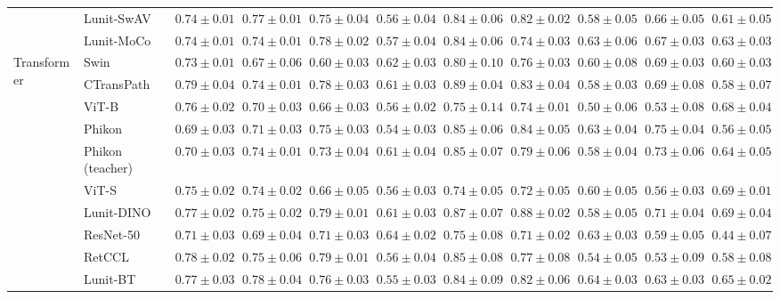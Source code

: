 \begin{tabular}{ll|cccc|c|cccc}
 & Lunit-SwAV & $0.74 \pm 0.01$ & $0.77 \pm 0.01$ & $0.75 \pm 0.04$ & $0.56 \pm 0.04$ & $0.84 \pm 0.06$ & $0.82 \pm 0.02$ & $0.58 \pm 0.05$ & $0.66 \pm 0.05$ & $0.61 \pm 0.05$ \\
 & Lunit-MoCo & $0.74 \pm 0.01$ & $0.74 \pm 0.01$ & $0.78 \pm 0.02$ & $0.57 \pm 0.04$ & $0.84 \pm 0.06$ & $0.74 \pm 0.03$ & $\mathbf{0.63 \pm 0.06}$ & $0.67 \pm 0.03$ & $0.63 \pm 0.03$ \\
\cline{1-11}
\multirow[t]{12}{*}{Transformer} & Swin & $0.73 \pm 0.01$ & $0.67 \pm 0.06$ & $0.60 \pm 0.03$ & $0.62 \pm 0.03$ & $0.80 \pm 0.10$ & $0.76 \pm 0.03$ & $0.60 \pm 0.08$ & $0.69 \pm 0.03$ & $0.60 \pm 0.03$ \\
 & CTransPath & $\mathbf{0.79 \pm 0.04}$ & $0.74 \pm 0.01$ & $0.78 \pm 0.03$ & $0.61 \pm 0.03$ & $\mathbf{0.89 \pm 0.04}$ & $0.83 \pm 0.04$ & $0.58 \pm 0.03$ & $0.69 \pm 0.08$ & $0.58 \pm 0.07$ \\
 & ViT-B & $0.76 \pm 0.02$ & $0.70 \pm 0.03$ & $0.66 \pm 0.03$ & $0.56 \pm 0.02$ & $0.75 \pm 0.14$ & $0.74 \pm 0.01$ & $0.50 \pm 0.06$ & $0.53 \pm 0.08$ & $0.68 \pm 0.04$ \\
 & Phikon & $0.69 \pm 0.03$ & $0.71 \pm 0.03$ & $0.75 \pm 0.03$ & $0.54 \pm 0.03$ & $0.85 \pm 0.06$ & $0.84 \pm 0.05$ & $0.63 \pm 0.04$ & $\mathbf{0.75 \pm 0.04}$ & $0.56 \pm 0.05$ \\
 & Phikon (teacher) & $0.70 \pm 0.03$ & $0.74 \pm 0.01$ & $0.73 \pm 0.04$ & $0.61 \pm 0.04$ & $0.85 \pm 0.07$ & $0.79 \pm 0.06$ & $0.58 \pm 0.04$ & $0.73 \pm 0.06$ & $0.64 \pm 0.05$ \\
 & ViT-S & $0.75 \pm 0.02$ & $0.74 \pm 0.02$ & $0.66 \pm 0.05$ & $0.56 \pm 0.03$ & $0.74 \pm 0.05$ & $0.72 \pm 0.05$ & $0.60 \pm 0.05$ & $0.56 \pm 0.03$ & $\mathbf{0.69 \pm 0.01}$ \\
 & Lunit-DINO & $0.77 \pm 0.02$ & $0.75 \pm 0.02$ & $0.79 \pm 0.01$ & $0.61 \pm 0.03$ & $0.87 \pm 0.07$ & $\mathbf{0.88 \pm 0.02}$ & $0.58 \pm 0.05$ & $0.71 \pm 0.04$ & $0.69 \pm 0.04$ \\
 & ResNet-50 & $0.71 \pm 0.03$ & $0.69 \pm 0.04$ & $0.71 \pm 0.03$ & $\mathbf{0.64 \pm 0.02}$ & $0.75 \pm 0.08$ & $0.71 \pm 0.02$ & $0.63 \pm 0.03$ & $0.59 \pm 0.05$ & $0.44 \pm 0.07$ \\
 & RetCCL & $0.78 \pm 0.02$ & $0.75 \pm 0.06$ & $\mathbf{0.79 \pm 0.01}$ & $0.56 \pm 0.04$ & $0.85 \pm 0.08$ & $0.77 \pm 0.08$ & $0.54 \pm 0.05$ & $0.53 \pm 0.09$ & $0.58 \pm 0.08$ \\
 & Lunit-BT & $0.77 \pm 0.03$ & $0.78 \pm 0.04$ & $0.76 \pm 0.03$ & $0.55 \pm 0.03$ & $0.84 \pm 0.09$ & $0.82 \pm 0.06$ & $\mathbf{0.64 \pm 0.03}$ & $0.63 \pm 0.03$ & $0.65 \pm 0.02$ \\

\end{tabular}
